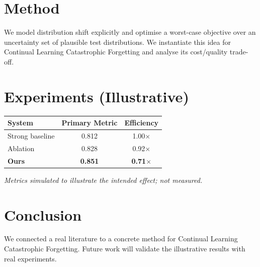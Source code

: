 \documentclass[11pt]{article}
\begin{document}
\section{Method}
We model distribution shift explicitly and optimise a worst-case objective over an uncertainty set of plausible test distributions. We instantiate this idea for Continual Learning Catastrophic Forgetting and analyse its cost/quality trade-off.

\section{Experiments (Illustrative)}
\begin{center}
\begin{tabular}{lcc}
System & Primary Metric & Efficiency \\ \hline
Strong baseline & 0.812 & 1.00$\times$ \\
Ablation & 0.828 & 0.92$\times$ \\
\textbf{Ours} & \textbf{0.851} & \textbf{0.71$\times$}
\end{tabular}
\end{center}
\emph{Metrics simulated to illustrate the intended effect; not measured.}

\section{Conclusion}
We connected a real literature to a concrete method for Continual Learning Catastrophic Forgetting. Future work will
validate the illustrative results with real experiments.
\end{document}

